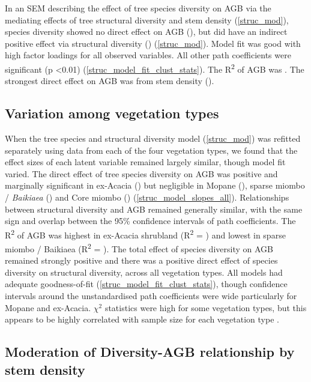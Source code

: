 \documentclass[11pt,a4paper]{article}
\begin{document}
In an SEM describing the effect of tree species diversity on AGB via the mediating effects of tree structural diversity and stem density (\autoref{struc_mod}), species diversity showed no direct effect on AGB (\strucbetadb{}), but did have an indirect positive effect via structural diversity (\strucbetadib{}) (\autoref{struc_mod}). Model fit was good with high factor loadings for all observed variables. All other path coefficients were significant (p <0.01) (\autoref{struc_model_fit_clust_stats}). The R\textsuperscript{2} of AGB was \strucrsq{}. The strongest direct effect on AGB was from stem density (\strucbetaib{}).

\subsection{Variation among vegetation types}

When the tree species and structural diversity model (\autoref{struc_mod}) was refitted separately using data from each of the four vegetation types, we found that the effect sizes of each latent variable remained largely similar, though model fit varied. The direct effect of tree species diversity on AGB was positive and marginally significant in ex-Acacia (\strucbetacsb{}) but negligible in Mopane (\strucbetadsb{}), sparse miombo / \textit{Baikiaea} (\strucbetaasb{}) and Core miombo (\strucbetabsb{}) (\autoref{struc_model_slopes_all}). Relationships between structural diversity and AGB remained generally similar, with the same sign and overlap between the 95\% confidence intervals of path coefficients. The R\textsuperscript{2} of AGB was highest in ex-Acacia shrubland (R\textsuperscript{2} = \struccrsq{}) and lowest in sparse miombo / Baikiaea (R\textsuperscript{2} = \strucarsq{}). The total effect of species diversity on AGB remained strongly positive and there was a positive direct effect of species diversity on structural diversity, across all vegetation types. All models had adequate goodness-of-fit (\autoref{struc_model_fit_clust_stats}), though confidence intervals around the unstandardised path coefficients were wide particularly for Mopane and ex-Acacia. $\chi^{2}$ statistics were high for some vegetation types, but this appears to be highly correlated with sample size for each vegetation type \citep{Hooper2008}.


\subsection{Moderation of Diversity-AGB relationship by stem density}
\end{document}
